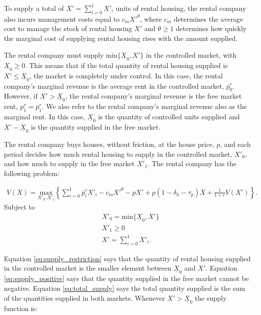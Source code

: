 \documentclass[parskip=full]{article}
\begin{document}
To supply a total of $X'=\sum^{1}_{i=0} X'_{i}$ units of rental housing, the rental company also incurs management costs equal to $c_{m}X'^{\theta}$, where $c_{m}$ determines the average cost to manage the stock of rental housing $X'$ and $\theta\geq 1$ determines how quickly the marginal cost of supplying rental housing rises with the amount supplied. 

The rental company must supply $\mbox{min}\{\underline{X}_{0},X'\}$ in the controlled market, with $\underline{X}_{0} \geq 0$. This means that if the total quantity of rental housing supplied is $X'\leq \underline{X}_{0}$, the market is completely under control. In this case, the rental company's marginal revenue is the average rent in the controlled market, $\overline{p}^{r}_{0}$. However, if $X'>\underline{X}_{0}$, the rental company's marginal revenue is the free market rent, $p^{r}_{1}=\overline{p}^{r}_{1}$. We also refer to the rental company's marginal revenue also as the marginal rent. In this case, $\underline{X}_{0}$ is the quantity of controlled units supplied and $X'-\underline{X}_{0}$ is the quantity supplied in the free market.

The rental company buys houses, without friction, at the house price, $p$, and each period decides how much rental housing to supply in the controlled market, $X'_{0}$, and how much to supply in the free market $X'_{1}$. The rental company has the following problem:

\begin{align}\label{eq:rental_company_problem}
V(X)=\underset{X'_{0},X'_{1}} {\text{$\mbox{max} $}}\left\{\sum_{i=0}^{1} \overline{p}^{r}_{i}X'_{i}-c_{m}X'^{\theta}-p X'+p(1-\delta_{h}-\tau_{p})X+\frac{1}{1+r}V(X')\right\}.
\end{align}
Subject to
\begin{align}
& X'_{0}=\mbox{min}\{\underline{X}_{0},X'\} \label{eq:supply_restriction} \\
& X'_{1} \geq 0 \label{eq:supply_positive} \\
& X'=\sum^{1}_{i=0} X'_{i}. \label{eq:total_supply} 
\end{align}

\noindent Equation \ref{eq:supply_restriction} says that the quantity of rental housing supplied in the controlled market is the smaller element between $\underline{X}_{0}$ and $X'$. Equation \ref{eq:supply_positive} says that the quantity supplied in the free market cannot be negative. Equation \ref{eq:total_supply} says the total quantity supplied is the sum of the quantities supplied in both markets. Whenever $X'>\underline{X}_{0}$ the supply function is:
\end{document}
